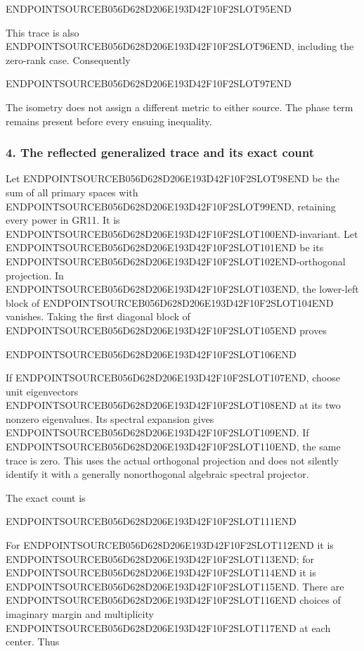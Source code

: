 ENDPOINTSOURCEB056D628D206E193D42F10F2SLOT95END

This trace is also ENDPOINTSOURCEB056D628D206E193D42F10F2SLOT96END, including the zero-rank case. Consequently

ENDPOINTSOURCEB056D628D206E193D42F10F2SLOT97END

The isometry does not assign a different metric to either source. The phase term remains present before every ensuing inequality.

\subsubsection{4. The reflected generalized trace and its exact count}\label{endpoint-gamma_review--the-reflected-generalized-trace-and-its-exact-count}

Let ENDPOINTSOURCEB056D628D206E193D42F10F2SLOT98END be the sum of all primary spaces with ENDPOINTSOURCEB056D628D206E193D42F10F2SLOT99END, retaining every power in GR11. It is ENDPOINTSOURCEB056D628D206E193D42F10F2SLOT100END-invariant. Let ENDPOINTSOURCEB056D628D206E193D42F10F2SLOT101END be its ENDPOINTSOURCEB056D628D206E193D42F10F2SLOT102END-orthogonal projection. In ENDPOINTSOURCEB056D628D206E193D42F10F2SLOT103END, the lower-left block of ENDPOINTSOURCEB056D628D206E193D42F10F2SLOT104END vanishes. Taking the first diagonal block of ENDPOINTSOURCEB056D628D206E193D42F10F2SLOT105END proves

ENDPOINTSOURCEB056D628D206E193D42F10F2SLOT106END

If ENDPOINTSOURCEB056D628D206E193D42F10F2SLOT107END, choose unit eigenvectors ENDPOINTSOURCEB056D628D206E193D42F10F2SLOT108END at its two nonzero eigenvalues. Its spectral expansion gives ENDPOINTSOURCEB056D628D206E193D42F10F2SLOT109END. If ENDPOINTSOURCEB056D628D206E193D42F10F2SLOT110END, the same trace is zero. This uses the actual orthogonal projection and does not silently identify it with a generally nonorthogonal algebraic spectral projector.

The exact count is

ENDPOINTSOURCEB056D628D206E193D42F10F2SLOT111END

For ENDPOINTSOURCEB056D628D206E193D42F10F2SLOT112END it is ENDPOINTSOURCEB056D628D206E193D42F10F2SLOT113END; for ENDPOINTSOURCEB056D628D206E193D42F10F2SLOT114END it is ENDPOINTSOURCEB056D628D206E193D42F10F2SLOT115END. There are ENDPOINTSOURCEB056D628D206E193D42F10F2SLOT116END choices of imaginary margin and multiplicity ENDPOINTSOURCEB056D628D206E193D42F10F2SLOT117END at each center. Thus

